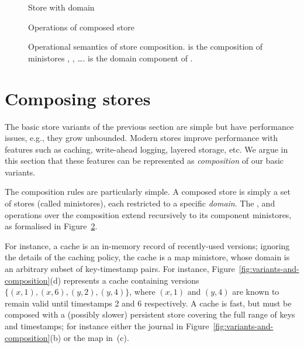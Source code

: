 \begin{figure}[tp]\small\centering
  
  \caption{Store \astore{} with domain
    \adomain[\astore]
  }
  \label{fig:domain-semantics}
\end{figure}
\begin{figure}[tp]
  \small\centering
  
  \caption{Operations of composed store}
  \label{fig:composed-ops}
\end{figure}
\begin{figure}[tp]\small\centering
  
  \caption{Operational semantics of store composition.
    \small
    \astore{} is the composition of ministores \astore[1], \astore[2],
    \ldots{}.
    \adomain[\astore] is the domain component of \afield[\astore].
  }
  \label{fig:store-composition-semantics}
\end{figure}

\section{Composing stores}
\label{sec:composed-store-variant}

The basic store variants of the previous section are
simple but have performance issues, e.g., they grow unbounded.
Modern stores improve performance with features such as caching,
write-ahead logging, layered storage, etc.
We argue in this section that these features can be represented as
\emph{composition} of our basic variants.

The composition rules are particularly simple.
A composed store is simply a set of stores (called ministores),
each restricted to a specific \emph{domain}.
The \lookup{}, \doUpdate{} and \doCommit{} operations over the
composition extend recursively to its component ministores, as
formalised in Figure~\ref{fig:composed-ops}.

For instance, a cache is an in-memory record of recently-used versions;
ignoring the details of the caching policy, the cache is a map
ministore, whose domain is an arbitrary subset of key-timestamp pairs.
For instance, Figure~\ref{fig:variants-and-composition}(d) represents a
cache containing versions $\{ (x,1), (x,6), (y,2), (y,4) \}$, where $(x,
1)$ and $(y, 4)$ are known to remain valid until timestamps 2 and 6
respectively.
A cache is fast, but must be composed with a (possibly slower)
persistent store covering the full range of keys and timestamps; for
instance either the journal in
Figure~\ref{fig:variants-and-composition}(b) or the map in~(c).

